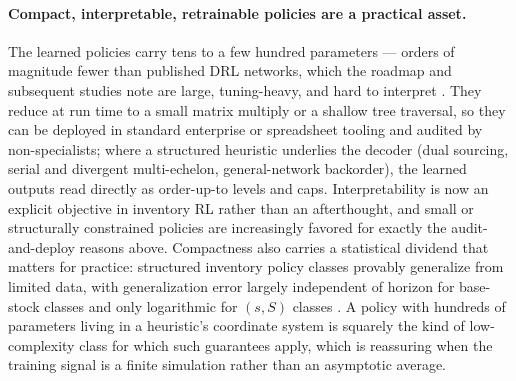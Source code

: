 \paragraph{Compact, interpretable, retrainable policies are a practical asset.}
The learned policies carry tens to a few hundred parameters --- orders of magnitude fewer than
published DRL networks, which the roadmap and subsequent studies note are large, tuning-heavy, and
hard to interpret \citep{boute2022deep,gijsbrechts2022drl,kaynov2024owmr}. They reduce at run time to
a small matrix multiply or a shallow tree traversal, so they can be deployed in standard enterprise or
spreadsheet tooling and audited by non-specialists; where a structured heuristic underlies the decoder
(dual sourcing, serial and divergent multi-echelon, general-network backorder), the learned outputs
read directly as order-up-to levels and caps. Interpretability is now an explicit objective in
inventory RL rather than an afterthought, and small or structurally constrained policies are
increasingly favored for exactly the audit-and-deploy reasons above. Compactness also carries a
statistical dividend that matters for practice: structured inventory policy classes provably generalize
from limited data, with generalization error largely independent of horizon for base-stock classes and
only logarithmic for $(s,S)$ classes \citep{xie2024vc}. A policy with hundreds of parameters living in
a heuristic's coordinate system is squarely the kind of low-complexity class for which such guarantees
apply, which is reassuring when the training signal is a finite simulation rather than an asymptotic
average.

